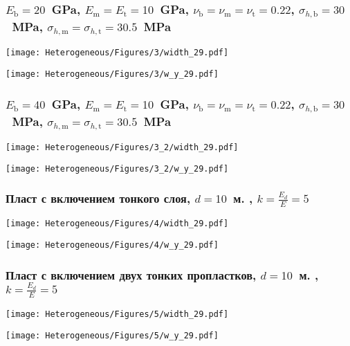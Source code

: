 \begin{frame}
    \frametitle{$E_\text{b} = 20$~GPa, $E_\text{m} = E_\text{t} = 10$~GPa, $\nu_\text{b} = \nu_\text{m} = \nu_\text{t} = 0.22$, $\sigma_{h,\text{b}} = 30$~MPa, $\sigma_{h,\text{m}} = \sigma_{h,\text{t}} = 30.5$~MPa}
    \begin{minipage}[t]{0.4\linewidth}
        \texttt{[image: Heterogeneous/Figures/3/width\_29.pdf]}
    \end{minipage}
    \hfill
    \begin{minipage}[t]{0.57\linewidth}
        \texttt{[image: Heterogeneous/Figures/3/w\_y\_29.pdf]}
    \end{minipage}
\end{frame}

\begin{frame}
    \frametitle{$E_\text{b} = 40$~GPa, $E_\text{m} = E_\text{t} = 10$~GPa, $\nu_\text{b} = \nu_\text{m} = \nu_\text{t} = 0.22$, $\sigma_{h,\text{b}} = 30$~MPa, $\sigma_{h,\text{m}} = \sigma_{h,\text{t}} = 30.5$~MPa}
    \begin{minipage}[t]{0.4\linewidth}
        \texttt{[image: Heterogeneous/Figures/3\_2/width\_29.pdf]}
    \end{minipage}
    \hfill
    \begin{minipage}[t]{0.57\linewidth}
        \texttt{[image: Heterogeneous/Figures/3\_2/w\_y\_29.pdf]}
    \end{minipage}
\end{frame}

\begin{frame}
    \frametitle{Пласт с включением тонкого слоя, $d=10$~м. , $k=\frac{E_d}{E}=5$}
    \begin{minipage}[t]{0.4\linewidth}
        \texttt{[image: Heterogeneous/Figures/4/width\_29.pdf]}
    \end{minipage}
    \hfill
    \begin{minipage}[t]{0.57\linewidth}
        \texttt{[image: Heterogeneous/Figures/4/w\_y\_29.pdf]}
    \end{minipage}
\end{frame}

\begin{frame}
    \frametitle{Пласт с включением двух тонких пропластков, $d=10$~м. , $k=\frac{E_d}{E}=5$}
    \begin{minipage}[t]{0.4\linewidth}
        \texttt{[image: Heterogeneous/Figures/5/width\_29.pdf]}
    \end{minipage}
    \hfill
    \begin{minipage}[t]{0.57\linewidth}
        \texttt{[image: Heterogeneous/Figures/5/w\_y\_29.pdf]}
    \end{minipage}
\end{frame}